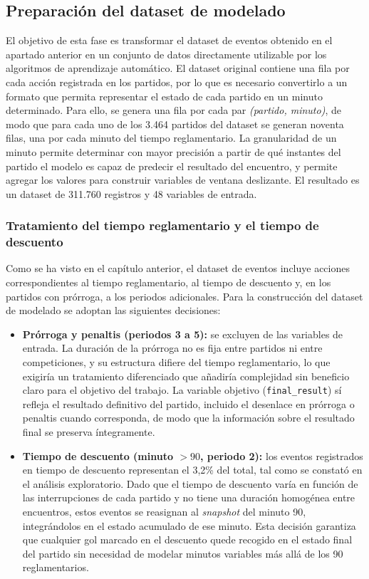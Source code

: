 \subsection{Preparación del dataset de modelado}

El objetivo de esta fase es transformar el dataset de eventos obtenido en el apartado anterior en un conjunto de datos directamente utilizable por los algoritmos de aprendizaje automático. El dataset original contiene una fila por cada acción registrada en los partidos, por lo que es necesario convertirlo a un formato que permita representar el estado de cada partido en un minuto determinado. Para ello, se genera una fila por cada par \textit{(partido, minuto)}, de modo que para cada uno de los 3.464 partidos del dataset se generan noventa filas, una por cada minuto del tiempo reglamentario. La granularidad de un minuto permite determinar con mayor precisión a partir de qué instantes del partido el modelo es capaz de predecir el resultado del encuentro, y permite agregar los valores para construir variables de ventana deslizante. El resultado es un dataset de 311.760 registros y 48 variables de entrada.

\subsubsection{Tratamiento del tiempo reglamentario y el tiempo de descuento}

Como se ha visto en el capítulo anterior, el dataset de eventos incluye acciones correspondientes al tiempo reglamentario, al tiempo de descuento y, en los partidos con prórroga, a los periodos adicionales. Para la construcción del dataset de modelado se adoptan las siguientes decisiones:

\begin{itemize}
    \item \textbf{Prórroga y penaltis (periodos 3 a 5):} se excluyen de las variables de entrada. La duración de la prórroga no es fija entre partidos ni entre competiciones, y su estructura difiere del tiempo reglamentario, lo que exigiría un tratamiento diferenciado que añadiría complejidad sin beneficio claro para el objetivo del trabajo. La variable objetivo (\texttt{final\_result}) sí refleja el resultado definitivo del partido, incluido el desenlace en prórroga o penaltis cuando corresponda, de modo que la información sobre el resultado final se preserva íntegramente.

    \item \textbf{Tiempo de descuento (minuto $> 90$, periodo 2):} los eventos registrados en tiempo de descuento representan el 3,2\% del total, tal como se constató en el análisis exploratorio. Dado que el tiempo de descuento varía en función de las interrupciones de cada partido y no tiene una duración homogénea entre encuentros, estos eventos se reasignan al \textit{snapshot} del minuto 90, integrándolos en el estado acumulado de ese minuto. Esta decisión garantiza que cualquier gol marcado en el descuento quede recogido en el estado final del partido sin necesidad de modelar minutos variables más allá de los 90 reglamentarios.
\end{itemize}

